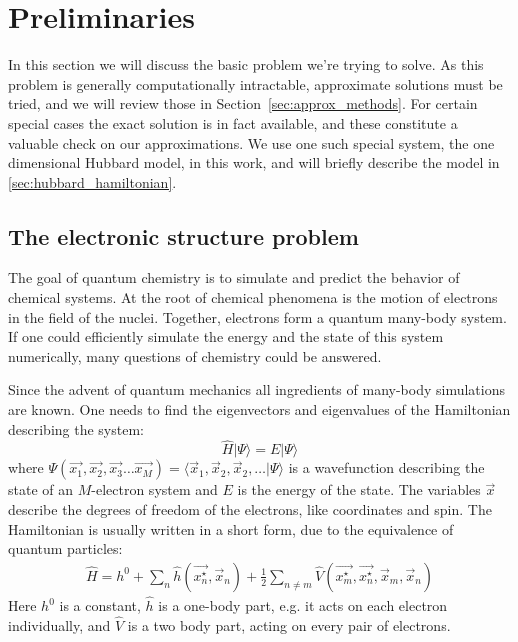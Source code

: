 \chapter{Preliminaries
\label{ch:preliminaries}}
In this section we will discuss the basic problem we're trying to solve.  
As this problem is generally computationally intractable, approximate solutions 
must be tried, and we will review those in Section~\ref{sec:approx_methods}. 
For certain special cases the exact solution is in fact available, and 
these constitute a valuable check on our approximations. We use one such 
special system, the one dimensional Hubbard model, in this work, and will 
briefly describe the model in \ref{sec:hubbard_hamiltonian}.

\section{The electronic structure problem}
\label{sec:motivation}
The goal of quantum chemistry is to simulate and predict the behavior 
of chemical systems. At the root of chemical phenomena is the motion 
of electrons in the field of the nuclei. Together, electrons form a quantum 
many-body system. If one could efficiently simulate the energy and 
the state of this system numerically, many questions of chemistry could be 
answered.

Since the advent of quantum mechanics all ingredients of many-body simulations 
are known. One needs to find the eigenvectors and eigenvalues of the 
Hamiltonian describing the system:
%
\begin{equation}
 \hat{H} | \Psi \rangle = E | \Psi \rangle
 \label{eq:schroedinger}
\end{equation}
%
where $\Psi(\vec{x_{1}}, \vec{x_{2}}, \vec{x_{3}}\ldots 
\vec{x_{M}}) = \langle \vec{x}_{1}, \vec{x}_{2}, \vec{x}_{2}, \ldots |\Psi 
\rangle$ is a wavefunction describing the state of an $M$-electron system 
and $E$ is the energy of the state. The variables $\vec{x}$ describe the 
degrees of freedom of the electrons, like coordinates and spin.
The Hamiltonian is usually written in a short form, due to the 
equivalence of quantum particles:
%
\begin{equation}
\begin{aligned}
 \hat{H} = h^{0} + \sum_{n} \hat{h}(\vec{x^{\star}_{n}}, \vec{x}_{n}) + 
\frac{1}{2} \sum_{n \neq m} \hat{V}(\vec{x^{\star}_{m}}, \vec{x^{\star}_{n}}, 
\vec{x}_{m}, 
\vec{x}_{n}) 
\end{aligned}
\end{equation}
%
Here $h^{0}$ is a constant, $\hat{h}$ is a one-body part, e.g. it acts on each 
electron individually, and $\hat{V}$ is a two body part, acting on every pair 
of electrons. 

